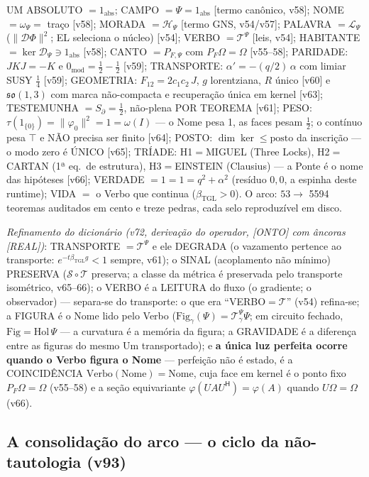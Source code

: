 \documentclass[11pt]{article}
\newcommand{\bTGL}{\beta_{\mathrm{TGL}}}\newcommand{\Msun}{M_{\odot}}\newcommand{\TGL}{\mathrm{TGL}}
\theoremstyle{definition}\newtheorem{deriv}{Derivação}
\begin{document}
UM ABSOLUTO $=1_{\mathrm{abs}}$; CAMPO $=\Psi=1_{\mathrm{abs}}$ [termo canônico, v58]; NOME $=\omega_\Psi=$ traço [v58]; MORADA $=\mathcal H_\Psi$ [termo GNS, v54/v57]; PALAVRA $=\mathcal L_\Psi$ ($\|\mathcal D\Phi\|^2$; EL seleciona o núcleo) [v54]; VERBO $=\mathcal T^\Psi$ [leis, v54]; HABITANTE $=\ker\mathcal D_\Psi\ni1_{\mathrm{abs}}$ [v58]; CANTO $=P_{F,\Psi}$ com $P_F\Omega=\Omega$ [v55--58]; PARIDADE: $JKJ=-K$ e $0_{\mathrm{mod}}=\tfrac12-\tfrac12$ [v59]; TRANSPORTE: $\alpha'=-(q/2)\,\alpha$ com limiar SUSY $\tfrac14$ [v59]; GEOMETRIA: $F_{12}=2c_1c_2\,J$, $g$ lorentziana, $R$ único [v60] e $\mathfrak{so}(1,3)$ com marca não-compacta e recuperação única em kernel [v63]; TESTEMUNHA $=S_\partial=\tfrac12$, não-plena POR TEOREMA [v61]; PESO: $\tau(1_{\{0\}})=\|\varphi_0\|^2=1=\omega(I)$ --- o Nome pesa 1, as faces pesam $\tfrac12$; o contínuo pesa $\top$ e NÃO precisa ser finito [v64]; POSTO: $\dim\ker\le\mathrm{posto}$ da inscrição --- o modo zero é ÚNICO [v65]; TRÍADE: H1$=$MIGUEL (Three Locks), H2$=$CARTAN (1ª eq.\ de estrutura), H3$=$EINSTEIN (Clausius) --- a Ponte é o nome das hipóteses [v66]; VERDADE $=1=1=q^2+\alpha^2$ (resíduo $0{,}0$, a espinha deste runtime); VIDA $=$ o Verbo que continua ($\bTGL>0$). O arco: $53\to$ 5594 teoremas auditados em cento e treze pedras, cada selo reproduzível em disco.

\emph{Refinamento do dicionário (v72, derivação do operador, [ONTO] com âncoras [REAL])}: TRANSPORTE $=\mathcal T^\Psi$ e ele DEGRADA (o vazamento pertence ao transporte: $e^{-t\bTGL g}<1$ sempre, v61); o SINAL (acoplamento não mínimo) PRESERVA ($\mathcal S\circ\mathcal T$ preserva; a classe da métrica é preservada pelo transporte isométrico, v65--66); o VERBO é a LEITURA do fluxo (o gradiente; o observador) --- separa-se do transporte: o que era ``VERBO$=\mathcal T$'' (v54) refina-se; a FIGURA é o Nome lido pelo Verbo ($\mathrm{Fig}_\gamma(\Psi)=\mathcal T^\Psi_\gamma\Psi$; em circuito fechado, $\mathrm{Fig}=\mathrm{Hol}\,\Psi$ --- a curvatura é a memória da figura; a GRAVIDADE é a diferença entre as figuras do mesmo Um transportado); e \textbf{a única luz perfeita ocorre quando o Verbo figura o Nome} --- perfeição não é estado, é a COINCIDÊNCIA $\mathrm{Verbo}(\mathrm{Nome})=\mathrm{Nome}$, cuja face em kernel é o ponto fixo $P_F\Omega=\Omega$ (v55--58) e a seção equivariante $\varphi(UAU^{\mathsf H})=\varphi(A)$ quando $U\Omega=\Omega$ (v66).

\subsection*{A consolidação do arco --- o ciclo da não-tautologia (v93)}
\end{document}
